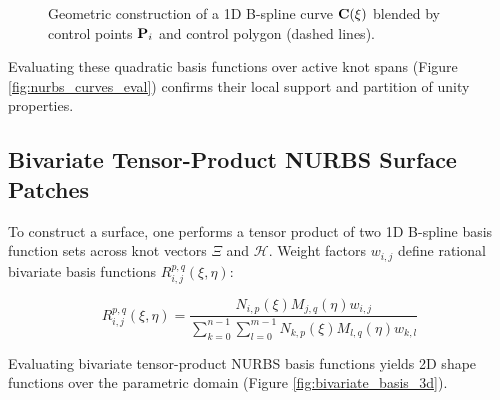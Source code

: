 \begin{figure}[htbp]
    \centering
    \caption{Geometric construction of a 1D B-spline curve $\mathbf{C}(\xi)$ blended by control points $\mathbf{P}_i$ and control polygon (dashed lines).}
    \label{fig:bspline_1d_curve}
\end{figure}

Evaluating these quadratic basis functions over active knot spans (Figure \ref{fig:nurbs_curves_eval}) confirms their local support and partition of unity properties.

\subsection{Bivariate Tensor-Product NURBS Surface Patches}
To construct a surface, one performs a tensor product of two 1D B-spline basis function sets across knot vectors $\Xi$ and $\mathcal{H}$. Weight factors $w_{i,j}$ define rational bivariate basis functions $R_{i,j}^{p,q}(\xi, \eta)$:

\begin{equation}
    R_{i,j}^{p,q}(\xi, \eta) = \frac{N_{i,p}(\xi) M_{j,q}(\eta) w_{i,j}}{\sum_{k=0}^{n-1} \sum_{l=0}^{m-1} N_{k,p}(\xi) M_{l,q}(\eta) w_{k,l}}
\end{equation}

Evaluating bivariate tensor-product NURBS basis functions yields 2D shape functions over the parametric domain (Figure \ref{fig:bivariate_basis_3d}).


